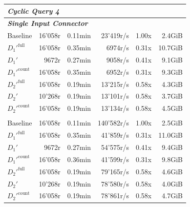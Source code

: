 \begin{longtable}{lrrrrr}
    \multicolumn{6}{l}{\textit{Cyclic Query 4}} \\
    \midrule
    \multicolumn{6}{l}{\textit{\textbf{Single Input Connector}}} \\
    \nopagebreak
    Baseline              &  16'058r              &  0.11min            &  23'419r/s           & 1.00x             & 2.4GiB    \\
    $D_1'^{\text{full}}$   &  16'058r              &  0.35min            &  6974r/s             & 0.31x             & 10.7GiB   \\
    \quad $D_1'$           &  9672r                &  0.27min            &  9058r/s             & 0.41x             & 9.1GiB    \\
    $D_1'^{\text{count}}$  &  16'058r              &  0.35min            &  6952r/s             & 0.31x             & 9.3GiB    \\
    $D_2'^{\text{full}}$   &  16'058r              &  0.19min            &  13'215r/s           & 0.58x             & 4.3GiB    \\
    \quad $D_2'$           &  10'268r              &  0.19min            &  13'101r/s           & 0.58x             & 3.7GiB    \\
    $D_2'^{\text{count}}$  &  16'058r              &  0.19min            &  13'134r/s           & 0.58x             & 4.5GiB    \\
    \addlinespace 
    
    \multicolumn{6}{l}{\textit{\textbf{6 Input Connectors}}} \\
    \nopagebreak
    Baseline              &  16'058r              &  0.11min            &  140'582r/s          & 1.00x             & 2.5GiB    \\
    $D_1'^{\text{full}}$   &  16'058r              &  0.35min            &  41'859r/s           & 0.31x             & 11.0GiB   \\
    \quad $D_1'$           &  9672r                &  0.27min            &  54'575r/s           & 0.41x             & 9.4GiB    \\
    $D_1'^{\text{count}}$  &  16'058r              &  0.36min            &  41'599r/s           & 0.31x             & 9.8GiB    \\
    $D_2'^{\text{full}}$   &  16'058r              &  0.19min            &  79'165r/s           & 0.58x             & 4.6GiB    \\
    \quad $D_2'$           &  10'268r              &  0.19min            &  78'580r/s           & 0.58x             & 4.0GiB    \\
    $D_2'^{\text{count}}$  &  16'058r              &  0.19min            &  78'861r/s           & 0.58x             & 4.7GiB    \\
    \midrule
    

\end{longtable}
